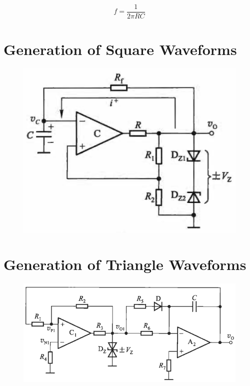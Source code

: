 \begin{equation*}
  \begin{aligned}
    f = \dfrac{1}{2 \pi RC}  
  \end{aligned}
\end{equation*}



\section{Generation of Square Waveforms}

\begin{figure}[H]
  \centering
  \includegraphics[width=0.5\linewidth]{figures/Square}
\end{figure}

\section{Generation of Triangle Waveforms}

\begin{figure}[H]
  \centering
  \includegraphics[width=0.8\linewidth]{figures/Triangle}
\end{figure}

